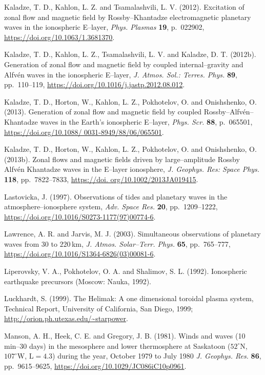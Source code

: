 \documentclass[a4paper,openany,12pt]{book}
\begin{document}
\begin{thebibliography}{100}
\bibitem{}
Kaladze, T. D., Kahlon, L. Z. and Tsamalashvili, L. V. (2012). Excitation of zonal flow and magnetic field by Rossby--Khantadze electromagnetic planetary waves in the ionospheric E--layer, \emph{Phys. Plasmas} \textbf{19}, 
p.~022902, \url{https://doi.org/10.1063/1.3681370}.

\bibitem{}
Kaladze, T. D., Kahlon, L. Z., Tsamalashvili, L. V. and Kaladze, D. T. (2012b). Generation of zonal flow and magnetic field by coupled internal--gravity and Alfv\'en waves in the ionospheric E--layer, \emph{J. Atmos. Sol.: Terres. Phys.}
\textbf{89}, pp.~110--119, \url{https://doi.org/10.1016/j.jastp.2012.08.012}.

\bibitem{}
Kaladze, T. D., Horton, W., Kahlon, L. Z., Pokhotelov, O. and Onishshenko, O. (2013). Generation of zonal flow and magnetic field by coupled Rossby--Alfv\'en--Khantadze waves in the Earth's ionospheric E--layer, \emph{Phys. Scr.} \textbf{88}, p.~065501, \url{https://doi.org/10.1088/ 0031-8949/88/06/065501}.

\bibitem{}
Kaladze, T. D., Horton, W., Kahlon, L. Z., Pokhotelov, O. and Onishshenko, O. (2013b). Zonal flows and magnetic fields driven by large--amplitude Rossby Alfv\'en Khantadze waves in the E--layer ionosphere, \emph{J. Geophys. Res: Space Phys.} \textbf{118}, pp.~7822--7833, \url{https://doi. org/10.1002/2013JA019415}.

\bibitem{}
Lastovicka, J. (1997). Observations of tides and planetary waves in the atmosphere--ionosphere system, \emph{Adv. Space Res.} \textbf{20}, pp.~1209--1222, \url{https://doi.org/10.1016/S0273-1177(97)00774-6}. 

\bibitem{}
Lawrence, A. R. and Jarvis, M. J. (2003). Simultaneous observations of planetary waves from 30 to $220\,$km, {\it J. Atmos. Solar--Terr. Phys.} \textbf{65}, pp.~765--777, \url{https://doi.org/10.1016/S1364-6826(03)00081-6}.

\bibitem{}
Liperovsky, V. A., Pokhotelov, O. A. and Shalimov, S. L. (1992). Ionospheric earthquake precursors (Moscow: Nauka, 1992).

\bibitem{}
Luckhardt, S. (1999). The Helimak: A one dimensional toroidal plasma system, Technical Report, University of California, San Diego, 1999; \url{http://orion.ph.utexas.edu/~starpower}.

\bibitem{}
Manson, A. H., Heek, C. E. and Gregory, J. B. (1981). Winds and waves (10 min--30 days) in the mesosphere and lower thermosphere at Saskatoon ($52^\circ$N, $107^\circ$W, L$=4.3$) during the year, October 1979 to July 1980 {\it J. Geophys. Res.} \textbf{86}, pp.~9615--9625, \url{https://doi.org/10.1029/JC086iC10p0961}.


\end{thebibliography}
\end{document}

